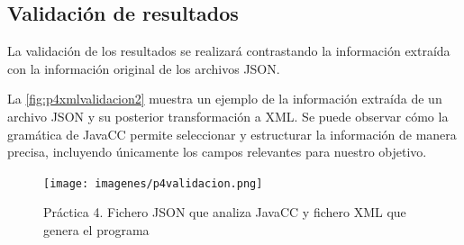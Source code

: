 


\subsection{Validación de resultados}

La validación de los resultados se realizará contrastando la información extraída con la información original de los archivos JSON. 

La \autoref{fig:p4xmlvalidacion2} muestra un ejemplo de la información extraída de un archivo JSON y su posterior transformación a XML. Se puede observar cómo la gramática de JavaCC permite seleccionar y estructurar la información de manera precisa, incluyendo únicamente los campos relevantes para nuestro objetivo.





\begin{figure}[H]
	\centering
	\texttt{[image: imagenes/p4validacion.png]}
	\caption{\label{fig:p4xmlvalidacion2}Práctica 4. Fichero JSON que analiza JavaCC y fichero XML que genera el programa}
\end{figure}



